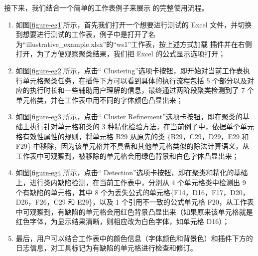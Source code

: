 接下来，我们结合一个简单的工作表例子来展示 \eg 的完整使用流程。
\begin{enumerate}
    \item 如图\ref{figure-eg1}所示，首先我们打开一个想要进行测试的 Excel 文件，并切换到想要进行测试的工作表，例子中是打开了名为“illustrative\_example.xlsx”的“ws1”工作表，按上述方式加载 \eg 插件并在右侧打开，为了方便观察聚类结果，我们把 Excel 的公式显示选项打开；
    \item 如图\ref{figure-eg2}所示，点击“ Clustering”选项卡按钮，即开始对当前工作表执行单元格聚类任务，在插件下方可以看到具体的执行流程包括 5 个部分以及对应的执行时长和一些辅助用户理解的信息，最终通过两阶段聚类检测到了 7 个单元格类，并在工作表中用不同的字体颜色凸显出来；
    \item 如图\ref{figure-eg3}所示，点击“ Cluster Refinement”选项卡按钮，即在聚类的基础上执行针对单元格和类的 3 种精化检验方法，在当前例子中，依据单个单元格有效性属性的规则，将单元格 B29 从原先的类 \{B29，C29，D29，E29 和 F29\} 中移除，因为该单元格并不具备和其他单元格类似的除法计算语义，从工作表中可观察到，被移除的单元格会用绿色背景和白色字体凸显出来；
    \item 如图\ref{figure-eg4}所示，点击“ Detection”选项卡按钮，即在聚类和精化的基础上，进行类内缺陷检测，在当前工作表中，分别从 4 个单元格类中检测出 9 个有缺陷的单元格，其中 8 个为丢失公式的单元格\{F14，D16，F17，D20，D26，F26，C29 和 E29\}，以及 1 个引用不一致的公式单元格 F20，从工作表中可观察到，有缺陷的单元格会用红色背景凸显出来（如果原来该单元格就是红色字体，为显示结果清晰，则相应改为白色字体，如单元格 D16）；
    \item 最后，用户可以结合工作表中的颜色信息（字体颜色和背景色）和插件下方的日志信息，对工具标记为有缺陷的单元格进行检查和修订。
\end{enumerate}